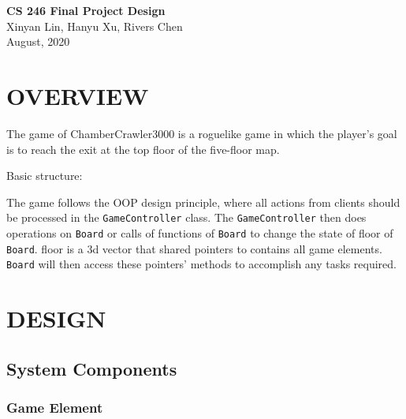 \documentclass[11pt]{article}
\theoremstyle{plain} \newtheorem{theorem*}{Theorem}[subsection]
\begin{document}
\begin{center}
{\LARGE \textbf{CS 246 Final Project Design}}\\
\vspace{0.15 in}
Xinyan Lin, Hanyu Xu, Rivers Chen\\ 
\vspace{0.07 in} August, 2020 
\end{center}

\vspace{0.3 in} 
\section{OVERVIEW} 
The game of ChamberCrawler3000 is a roguelike game in which the player’s goal
is to reach the exit at the top floor of the five-floor map.  

Basic structure:

The game follows the OOP design principle, where all actions from clients
should be processed in the \texttt{GameController} class. The 
\texttt{GameController} then does operations on \texttt{Board} or calls 
of functions of \texttt{Board} to change the state of \textsf{floor} of
\texttt{Board}. \textsf{floor} is a 3d vector that shared pointers to
contains all game elements. \texttt{Board} will then access these pointers'
methods to accomplish any tasks required.\\



\section{DESIGN} 

\subsection{System Components}

\subsubsection{Game Element}
\end{document}
